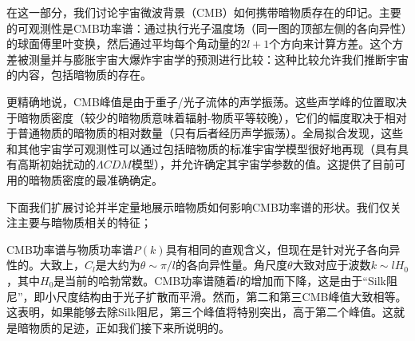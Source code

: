 
在这一部分，我们讨论宇宙微波背景（CMB）如何携带暗物质存在的印记。主要的可观测性是CMB功率谱：通过执行光子温度场（同一图的顶部左侧的各向异性）的球面傅里叶变换，然后通过平均每个角动量的$2l+1$个方向来计算方差。这个方差被测量并与膨胀宇宙大爆炸宇宙学的预测进行比较：这种比较允许我们推断宇宙的内容，包括暗物质的存在。

更精确地说，CMB峰值是由于重子/光子流体的声学振荡。这些声学峰的位置取决于暗物质密度（较少的暗物质意味着辐射-物质平等较晚），它们的幅度取决于相对于普通物质的暗物质的相对数量（只有后者经历声学振荡）。全局拟合发现，这些和其他宇宙学可观测性可以通过包括暗物质的标准宇宙学模型很好地再现（具有具有高斯初始扰动的$\Lambda CDM$模型），并允许确定其宇宙学参数的值。这提供了目前可用的暗物质密度的最准确确定。

下面我们扩展讨论并半定量地展示暗物质如何影响CMB功率谱的形状。我们仅关注主要与暗物质相关的特征； 

CMB功率谱与物质功率谱$P(k)$具有相同的直观含义，但现在是针对光子各向异性的。大致上，$C_l$是大约为$\theta \sim \pi /l$的各向异性量。角尺度$\theta$大致对应于波数$k \sim l H_0$，其中$H_0$是当前的哈勃常数。CMB功率谱随着$l$的增加而下降，这是由于“Silk阻尼”，即小尺度结构由于光子扩散而平滑。然而，第二和第三CMB峰值大致相等。这表明，如果能够去除Silk阻尼，第三个峰值将特别突出，高于第二个峰值。这就是暗物质的足迹，正如我们接下来所说明的。

